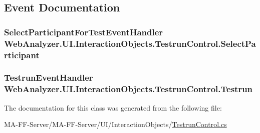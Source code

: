 \subsection{Event Documentation}
\hypertarget{class_web_analyzer_1_1_u_i_1_1_interaction_objects_1_1_testrun_control_abf256e52c1a039ca329f7c749a9087e4}{}
\subsubsection[{Select\+Participant}]{\setlength{\rightskip}{0pt plus 5cm}Select\+Participant\+For\+Test\+Event\+Handler Web\+Analyzer.\+U\+I.\+Interaction\+Objects.\+Testrun\+Control.\+Select\+Participant}\label{class_web_analyzer_1_1_u_i_1_1_interaction_objects_1_1_testrun_control_abf256e52c1a039ca329f7c749a9087e4}
\hypertarget{class_web_analyzer_1_1_u_i_1_1_interaction_objects_1_1_testrun_control_aec90f2bc94369619608e0059453752d3}{}
\subsubsection[{Testrun}]{\setlength{\rightskip}{0pt plus 5cm}Testrun\+Event\+Handler Web\+Analyzer.\+U\+I.\+Interaction\+Objects.\+Testrun\+Control.\+Testrun}\label{class_web_analyzer_1_1_u_i_1_1_interaction_objects_1_1_testrun_control_aec90f2bc94369619608e0059453752d3}


The documentation for this class was generated from the following file\+:\begin{DoxyCompactItemize}
\item 
M\+A-\/\+F\+F-\/\+Server/\+M\+A-\/\+F\+F-\/\+Server/\+U\+I/\+Interaction\+Objects/\hyperlink{_testrun_control_8cs}{Testrun\+Control.\+cs}\end{DoxyCompactItemize}
